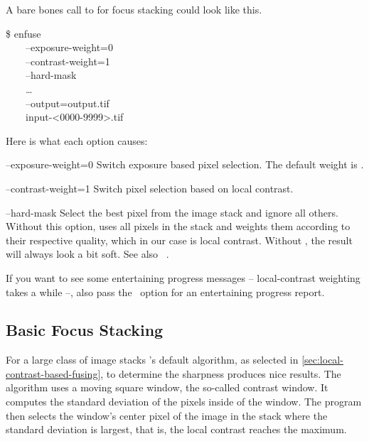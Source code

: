 A bare bones call to \App{} for focus stacking could look like this.

\begin{terminal}
  \$ enfuse \bslash \\
  ~~~~--exposure-weight=0 \bslash \\
  ~~~~--contrast-weight=1 \bslash \\
  ~~~~--hard-mask \bslash \\
  ~~~~\dots{} \bslash \\
  ~~~~--output=output.tif \bslash \\
  ~~~~input-<0000-9999>.tif
\end{terminal}

Here is what each option causes:

\begin{codelist}
\item[--exposure-weight=0]\itemend
  Switch  exposure based pixel selection.  The default weight is
  .

\item[--contrast-weight=1]\itemend
  Switch  pixel selection based on local contrast.

\item[--hard-mask]\itemend
  Select the best pixel from the image stack and ignore all others.  Without this option, \App{}
  uses all pixels in the stack and weights them according to their respective quality, which in
  our case is local contrast.  Without , the result will always look a bit
  soft.  See also \sectionName~.
\end{codelist}

If you want to see some entertaining progress messages -- local-contrast weighting takes a while
--, also pass the ~option for an entertaining progress report.


\subsection[Basic Focus Stacking]{\label{sec:basic-focus-stacking}%
  Basic Focus Stacking}

For a large class of image stacks \App{}'s default algorithm, as selected in
\ref{sec:local-contrast-based-fusing}, to determine the sharpness produces nice results.  The
algorithm uses a moving square window, the so-called contrast window.  It computes the standard
deviation of the pixels inside of the window.  The program then selects the window's center
pixel of the image in the stack where the standard deviation is largest, that is, the local
contrast reaches the maximum.

